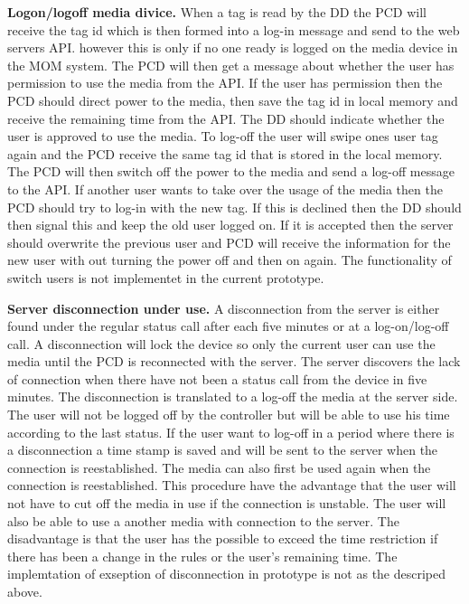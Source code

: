\textbf{Logon/logoff media divice.} \newline
When a tag is read by the DD the PCD will receive the tag id which is then formed into a log-in message and send to the web servers API. however this is only if no one ready is logged on the media device in the MOM system. The PCD will then get a message about whether the user has permission to use the media from the API. If the user has permission then the PCD should direct power to the media, then save the tag id in local memory and receive the remaining time from the API. The DD should indicate whether the user is approved to use the media.\newline 
To log-off the user will swipe ones user tag again and the PCD receive the same tag id that is stored in the local memory. The PCD will then switch off the power to the media and send a log-off message to the API. \newline
If another user wants to take over the usage of the media then the PCD should try to log-in with the new tag. If this is declined then the DD should then signal this and keep the old user logged on. If it is accepted then the server should overwrite the previous user and PCD will receive the information for the new user with out turning the power off and then on again.\newline 
The functionality of switch users is not implementet in the current prototype.\newline

\textbf{Server disconnection under use.} \newline
A disconnection from the server is either found under the regular status call after each five minutes or at a log-on/log-off call. A disconnection will lock the device so only the current user can use the media until the PCD is reconnected with the server. The server discovers the lack of connection when there have not been a status call from the device in five minutes. The disconnection is translated to a log-off the media at the server side. 
The user will not be logged off by the controller but will be able to use his time according to the last status. If the user want to log-off in a period where there is a disconnection a time stamp is saved and will be sent to the server when the connection is reestablished. The media can also first be used again when the connection is reestablished. 
This procedure have the advantage that the user will not have to cut off the media in use if the connection is unstable. The user will also be able to use a another media with connection to the server.
The disadvantage is that the user has the possible to exceed the time restriction if there has been a change in the rules or the user's remaining time. \newline
The implemtation of exseption of disconnection in prototype is not as the descriped above. \newline 
		
